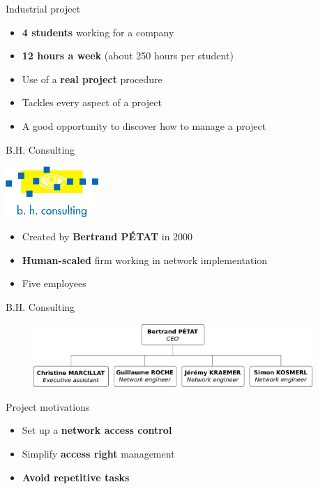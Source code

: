 \documentclass[12pt]{beamer}
\begin{document}
\begin{frame}{Industrial project}
    \begin{itemize}[<+->]
    \item \textbf{4 students} working for a company\vfill
    \item \textbf{12 hours a week} (about 250 hours per student)\vfill
    \item Use of a \textbf{real project} procedure\vfill
    \item Tackles every aspect of a project\vfill
    \item A good opportunity to discover how to manage a project\vfill
    \end{itemize}
\end{frame}

\begin{frame}{B.H. Consulting}
    \begin{center}
	\includegraphics[width=100pt]{img/BHConsulting.jpg}
    \end{center}

    \begin{itemize}[<+->]
    \item Created by \textbf{Bertrand PÉTAT} in 2000\vfill
    \item \textbf{Human-scaled} firm working in network implementation\vfill
    \item Five employees\vfill
    \end{itemize}
\end{frame}

\begin{frame}{B.H. Consulting}
\vfill
    \begin{figure}
	\includegraphics[width=300pt]{img/organigramme_en.pdf}
    \end{figure}
\vfill
\end{frame}

\begin{frame}{Project motivations}
    \begin{itemize}[<+->]
	\item Set up a \textbf{network access control}
	\vfill
	\item Simplify \textbf{access right} management
	\vfill
	\item \textbf{Avoid repetitive tasks}
    \end{itemize}

\end{frame}
    
\end{document}
